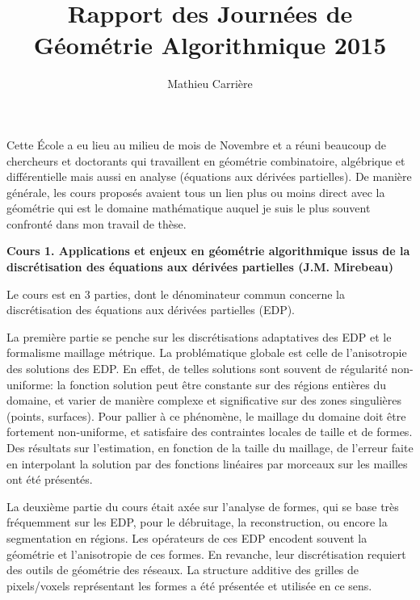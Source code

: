 \documentclass[a4paper, 11pt]{article}
\begin{document}
 
\title{Rapport des Journées de Géométrie Algorithmique 2015}
\author{Mathieu Carrière}
\date{}
 
\maketitle

Cette \'Ecole a eu lieu au milieu de mois de Novembre et a réuni beaucoup de chercheurs et doctorants qui travaillent en g\'eom\'etrie combinatoire, algébrique et différentielle mais aussi en analyse (équations aux dérivées partielles). De manière générale, les cours proposés avaient tous un lien plus ou moins
direct avec la géométrie
qui est le domaine mathématique auquel je suis le plus souvent confronté dans mon travail de thèse.  

\begin{center} \textbf{Cours 1. Applications et enjeux en géométrie algorithmique issus de la discrétisation des équations aux dérivées partielles (J.M. Mirebeau)} \end{center}

Le cours est en 3 parties, dont le dénominateur commun concerne
la discrétisation des équations aux dérivées partielles (EDP).

La première partie se penche sur les
discrétisations adaptatives des EDP et le formalisme maillage métrique.
La problématique globale est celle de l'anisotropie des 
solutions des EDP. En effet, de telles solutions sont souvent de régularité non-uniforme: la fonction solution peut être constante sur des régions entières du domaine, et varier de manière complexe et significative sur des zones singulières (points, surfaces).
Pour pallier à ce phénomène,
le maillage du domaine doit être fortement non-uniforme, et satisfaire des contraintes locales de taille et de formes.
Des résultats sur l'estimation, en fonction de la taille du maillage, de l'erreur faite en interpolant la solution par des fonctions linéaires par morceaux sur les mailles ont été présentés.

La deuxième partie du cours était axée sur l'analyse de formes, qui se base très fréquemment sur les EDP, pour le débruitage, la reconstruction, ou encore la segmentation en régions. Les opérateurs de ces EDP encodent souvent la géométrie et l'anisotropie de ces formes. En revanche, leur discrétisation requiert des outils de géométrie des réseaux. La structure additive des grilles de pixels/voxels représentant les formes a été présentée et utilisée en ce sens.
\end{document}
